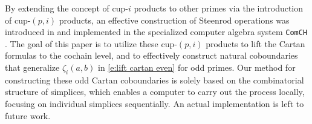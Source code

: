 By extending the concept of cup-$i$ products to other primes via the introduction of cup-$(p,i)$ products, an effective construction of Steenrod operations was introduced in \cite{medina2021may_st} and implemented in the specialized computer algebra system \texttt{ComCH} \cite{medina2021comch}.
The goal of this paper is to utilize these cup-$(p,i)$ products to lift the Cartan formulas to the cochain level, and to effectively construct natural coboundaries that generalize $\zeta_i(a,b)$ in \cref{e:lift cartan even} for odd primes.
Our method for constructing these odd Cartan coboundaries is solely based on the combinatorial structure of simplices, which enables a computer to carry out the process locally, focusing on individual simplices sequentially.
An actual implementation is left to future work.